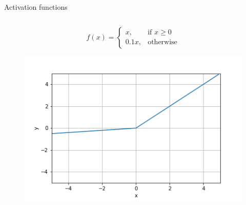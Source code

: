 \begin{frame}{Activation functions}
\begin{columns}[T]
\begin{column}{.5\textwidth}
			\tiny{
				\[
				f(x)= 
				\begin{cases}
					x,& \text{if } x\geq 0\\
					0.1x,              & \text{otherwise}
				\end{cases}
				\]
			}
			\begin{figure}
				\includegraphics[width=.6\textwidth, center]{figuras/leaky_relu.png}	
			\end{figure}
		\end{column}
	\end{columns}
\end{frame}
